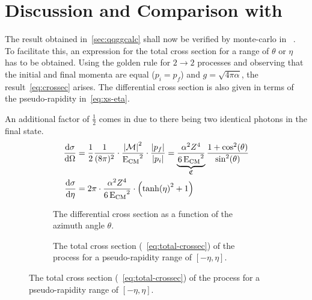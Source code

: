 
\section{Discussion and Comparison with \sherpa}%
\label{sec:compsher}

The result obtained in~\ref{sec:qqggcalc} shall now be verified by
monte-carlo in \sherpa{}~\cite{Gleisberg:2008ta}. To facilitate this, an
expression for the total cross section for a range of \(\theta\) or
\(\eta\) has to be obtained. Using the golden rule for
\(2\rightarrow 2\) processes and observing that the initial and final
momenta are equal (\(p_i=p_f\)) and \(g=\sqrt{4\pi\alpha}\), the
result~\eqref{eq:crossec} arises. The differential cross section is
also given in terms of the pseudo-rapidity in~\ref{eq:xs-eta}.

An additional factor of \(\frac{1}{2}\) comes in due to there being
two identical photons in the final state.
\begin{align}
  \dv{\sigma}{\Omega} &=
                        \frac{1}{2}\frac{1}{(8\pi)^2}\cdot\frac{\abs{\mathcal{M}}^2}{\operatorname{E_{\text{CM}}}^2}\cdot\frac{\abs{p_f}}{\abs{p_i}}
                        =
                        \underbrace{\frac{\alpha^2Z^4}{6\operatorname{E_{\text{CM}}}^2}}_{\mathfrak{C}}\frac{1+\cos^2(\theta)}{\sin^2(\theta)}\label{eq:crossec}
  \\
  \dv{\sigma}{\eta} &= 2\pi\cdot\frac{\alpha^2Z^4}{6\operatorname{E_{\text{CM}}}^2}\cdot\qty(\tanh(\eta)^2 + 1)\label{eq:xs-eta}
\end{align}

\begin{figure}[ht]
  \centering
  \begin{subfigure}[c]{.45\textwidth}
    \centering {}
    \caption[Plot of the differential cross section of the \(\qqgg\)
    process.]{\label{fig:diffxs} The differential cross section as a
      function of the azimuth angle \(\theta\). }
  \end{subfigure}
  \begin{subfigure}[c]{.45\textwidth}
  \centering
  \caption[Plot of the total cross section of the \(\qqgg\)
  process.]{\label{fig:totxs} The total cross section
    (~\ref{eq:total-crossec}) of the process for a pseudo-rapidity
    range of \([-\eta, \eta]\).}
  \end{subfigure}
\end{figure}


